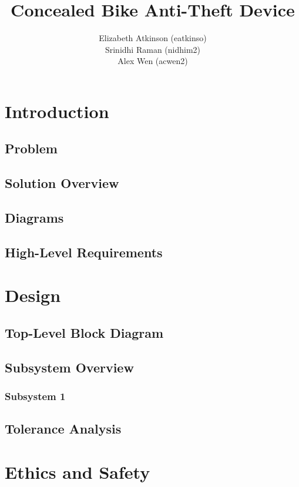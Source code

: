 \documentclass[]{article}
\title{Concealed Bike Anti-Theft Device}
\author{Elizabeth Atkinson (eatkinso)\\ Srinidhi Raman (nidhim2) \\ Alex Wen (acwen2) }
\begin{document}
\maketitle

\section{Introduction}
\subsection{Problem}

\subsection{Solution Overview}

\subsection{Diagrams}

\subsection{High-Level Requirements}


\section{Design}
\subsection{Top-Level Block Diagram}

\subsection{Subsystem Overview}
\subsubsection{Subsystem 1}

\subsection{Tolerance Analysis}

\section{Ethics and Safety}
\end{document}
